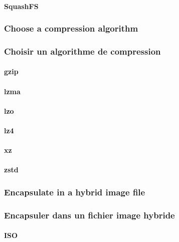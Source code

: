 \paragraph{SquashFS}

\ml
{\subsubsection{Choose a compression algorithm}}
{\subsubsection{Choisir un algorithme de compression}}

\paragraph{gzip}

\paragraph{lzma}

\paragraph{lzo}

\paragraph{lz4}

\paragraph{xz}

\paragraph{zstd}

\ml
{\subsubsection{Encapsulate in a hybrid image file}}
{\subsubsection{Encapsuler dans un fichier image hybride}}

\paragraph{ISO}

